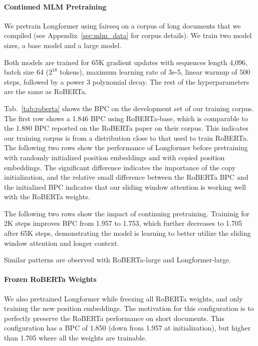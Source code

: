 \paragraph{Continued MLM Pretraining}

We pretrain Longformer using fairseq \cite{ott2019fairseq} on a corpus of long documents that we compiled (see Appendix~\ref{sec:mlm_data} for corpus details). We train two model sizes, a base model and a large model.

Both models are trained for 65K gradient updates with sequences length 4,096, batch size 64 ($2^{18}$ tokens), maximum learning rate of 3e-5, linear warmup of 500 steps, followed by a power 3 polynomial decay. The rest of the hyperparameters are the same as RoBERTa. 

Tab.~\ref{tab:roberta} shows the BPC on the development set of our training corpus. The first row shows a 1.846 BPC using RoBERTa-base, which is comparable to the 1.880 BPC reported on the RoBERTa paper on their corpus. This indicates our training corpus is from a distribution close to that used to train RoBERTa. The following two rows show the performance of Longformer before pretraining with randomly initialized position embeddings and with copied position embeddings. The significant difference indicates the importance of the copy initialization, and the relative small difference between the RoBERTa BPC and the initialized BPC indicates that our sliding window attention is working well with the RoBERTa weights.

The following two rows show the impact of continuing pretraining. Traininig for 2K steps improves BPC from 1.957 to 1.753, which further decreases to 1.705 after 65K steps, demonstrating the model is learning to better utilize the sliding window attention and longer context.

Similar patterns are observed with RoBERTa-large and Longformer-large.

\paragraph{Frozen RoBERTa Weights}

We also pretrained Longformer while freezing all RoBERTa weights, and only training the new position embeddings.  The motivation for this configuration is to perfectly preserve the RoBERTa performance on short documents. This configuration has a BPC of 1.850 (down from 1.957 at initialization), but higher than 1.705 where all the weights are trainable.

